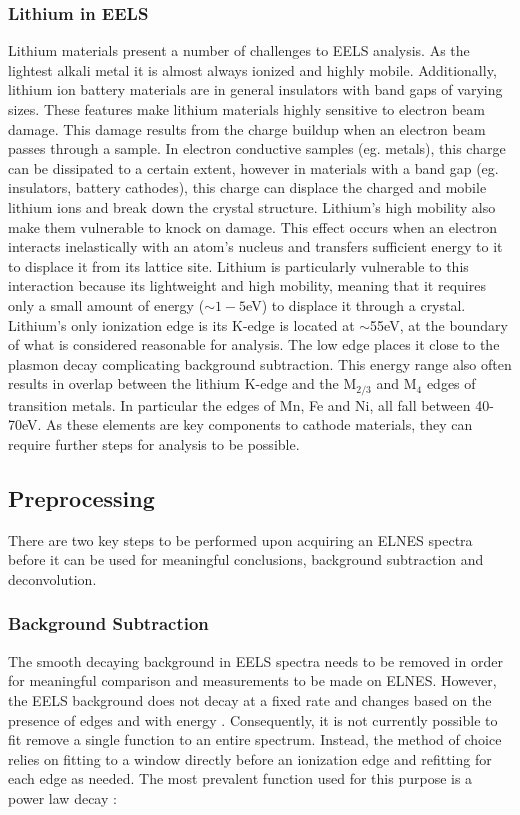 \subsubsection{Lithium in EELS}
Lithium materials present a number of challenges to EELS analysis.  As the lightest alkali metal it is almost always ionized and highly mobile. Additionally, lithium ion battery materials are in general insulators with band gaps of varying sizes. These features make lithium materials highly sensitive to electron beam damage.  This damage results from the charge buildup when an electron beam passes through a sample.  In electron conductive samples (eg. metals), this charge can be dissipated to a certain extent, however in materials with a band gap (eg. insulators, battery cathodes), this charge can displace the charged and mobile lithium ions and break down the crystal structure.  Lithium's high mobility also make them vulnerable to knock on damage.  This effect occurs when an electron interacts inelastically with an atom's nucleus and transfers sufficient energy to it to displace it from its lattice site.  Lithium is particularly vulnerable to this interaction because its lightweight and high mobility, meaning that it requires only a small amount of energy ($ \sim 1-5$eV) to displace it through a crystal.\\  
Lithium's only ionization edge is its K-edge is located at $\mathrm{\sim}$55eV, at the boundary of what is considered reasonable for analysis.  The low edge places it close to the plasmon decay complicating background subtraction.  This energy range also often results in overlap between the lithium K-edge and the $\mathrm{M_{2 / 3}}$ and $\mathrm{M_4}$ edges of transition metals. In particular the edges of Mn, Fe and Ni, all fall between 40-70eV.  As these elements are key components to cathode materials, they can require further steps for analysis to be possible.



\subsection{Preprocessing}

There are two key steps to be performed upon acquiring an ELNES spectra before it can be used for meaningful conclusions, background subtraction and deconvolution. 

\subsubsection{Background Subtraction} \label{bg_section}
The smooth decaying background in EELS spectra needs to be removed in order for meaningful comparison and measurements to be made on ELNES.  However, the EELS background does not decay at a fixed rate and changes based on the presence of edges and with energy \cite{new_bg}. Consequently, it is not currently possible to fit remove a single function to an entire spectrum.  Instead, the method of choice relies on fitting to a window directly before an ionization edge and refitting for each edge as needed.  The most prevalent function used for this purpose is a power law decay \cite{Egerton}: 

